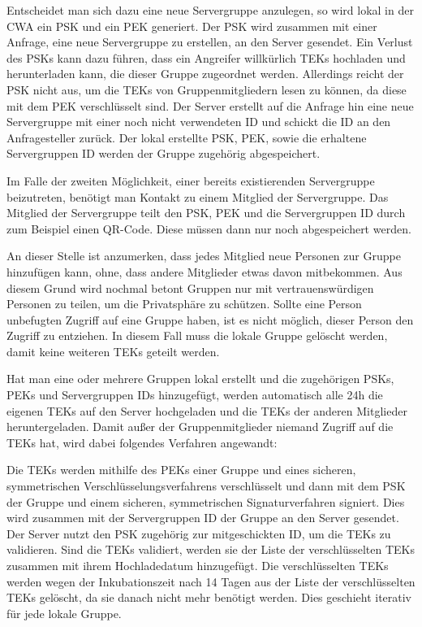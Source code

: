 \documentclass[conference,compsoc]{IEEEtran}
\begin{document}
Entscheidet man sich dazu eine neue Servergruppe anzulegen, so wird lokal in der CWA ein PSK und ein PEK generiert.
Der PSK wird zusammen mit einer Anfrage, eine neue Servergruppe zu erstellen, an den Server gesendet.
Ein Verlust des PSKs kann dazu führen, dass ein Angreifer willkürlich TEKs hochladen und herunterladen kann, die dieser Gruppe zugeordnet werden.
Allerdings reicht der PSK nicht aus, um die TEKs von Gruppenmitgliedern lesen zu können, da diese mit dem PEK verschlüsselt sind.
Der Server erstellt auf die Anfrage hin eine neue Servergruppe mit einer noch nicht verwendeten ID und schickt die ID an den Anfragesteller zurück.
Der lokal erstellte PSK, PEK, sowie die erhaltene Servergruppen ID werden der Gruppe zugehörig abgespeichert.

Im Falle der zweiten Möglichkeit, einer bereits existierenden Servergruppe beizutreten, benötigt man Kontakt zu einem Mitglied der Servergruppe.
Das Mitglied der Servergruppe teilt den PSK, PEK und die Servergruppen ID durch zum Beispiel einen QR-Code.
Diese müssen dann nur noch abgespeichert werden.

An dieser Stelle ist anzumerken, dass jedes Mitglied neue Personen zur Gruppe hinzufügen kann, ohne, dass andere Mitglieder etwas davon mitbekommen.
Aus diesem Grund wird nochmal betont Gruppen nur mit vertrauenswürdigen Personen zu teilen, um die Privatsphäre zu schützen.
Sollte eine Person unbefugten Zugriff auf eine Gruppe haben, ist es nicht möglich, dieser Person den Zugriff zu entziehen.
In diesem Fall muss die lokale Gruppe gelöscht werden, damit keine weiteren TEKs geteilt werden.

Hat man eine oder mehrere Gruppen lokal erstellt und die zugehörigen PSKs, PEKs und Servergruppen IDs hinzugefügt, 
werden automatisch alle 24h die eigenen TEKs auf den Server hochgeladen und die TEKs der anderen Mitglieder heruntergeladen.
Damit außer der Gruppenmitglieder niemand Zugriff auf die TEKs hat, wird dabei folgendes Verfahren angewandt:

Die TEKs werden mithilfe des PEKs einer Gruppe und eines sicheren, symmetrischen Verschlüsselungsverfahrens verschlüsselt und 
dann mit dem PSK der Gruppe und einem sicheren, symmetrischen Signaturverfahren signiert.
Dies wird zusammen mit der Servergruppen ID der Gruppe an den Server gesendet.
Der Server nutzt den PSK zugehörig zur mitgeschickten ID, um die TEKs zu validieren.
Sind die TEKs validiert, werden sie der Liste der verschlüsselten TEKs zusammen mit ihrem Hochladedatum hinzugefügt.
Die verschlüsselten TEKs werden wegen der Inkubationszeit nach 14 Tagen aus der Liste der verschlüsselten TEKs gelöscht, da sie danach nicht mehr benötigt werden.
Dies geschieht iterativ für jede lokale Gruppe.
\end{document}
